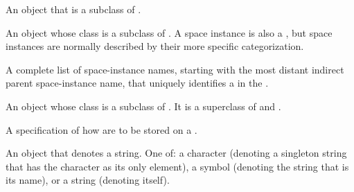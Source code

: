 \begin{glossary-list}

%
%
%
%
%
An object that is a subclass of \textbf{}.


%
%
%
%
%
%
An object whose class is a subclass of
\textbf{}.  A space instance is also a
, but space instances are normally described by their
more specific categorization.


%
%
%
%
A complete list of space-instance names, starting with the most distant
indirect parent space-instance name, that uniquely identifies a
 in the .


%
%
An object whose class is a subclass of 
\textbf{}. It is a superclass of
\textbf{} and
\textbf{}.


%
%
%
A specification of how  are to be stored on a
.


%
%
An object that denotes a string. One of: a character (denoting a
singleton string that has the character as its only element), a symbol
(denoting the string that is its name), or a string (denoting itself).



\end{glossary-list}
